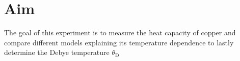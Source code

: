 \section{Aim}
\label{sec:versuchsziel}
The goal of this experiment is to measure the heat capacity of copper and compare different models explaining its temperature dependence to lastly determine the Debye temperature $\theta_\text{D}$